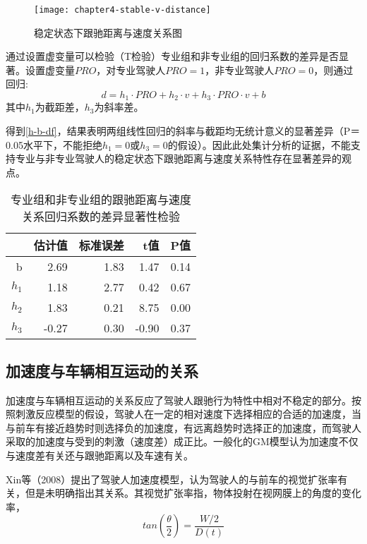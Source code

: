 \begin{figure}[htbp]
\begin{center}
\texttt{[image: chapter4-stable-v-distance]}
\end{center}
\caption{稳定状态下跟驰距离与速度关系图}
\label{stable-v-distance}
\end{figure}

通过设置虚变量可以检验（T检验）专业组和非专业组的回归系数的差异是否显著。设置虚变量$PRO$，对专业驾驶人$PRO=1$，非专业驾驶人$PRO=0$，则通过回归:
\begin{equation}
d=h_1 \cdot PRO+h_2\cdot v + h_3 \cdot PRO \cdot v +b
\end{equation}
其中$h_1$为截距差，$h_3$为斜率差。

得到\autoref{h-b-df}，结果表明两组线性回归的斜率与截距均无统计意义的显著差异（P＝0.05水平下，不能拒绝$h_1=0$或$h_3=0$的假设）。因此此处集计分析的证据，不能支持专业与非专业驾驶人的稳定状态下跟驰距离与速度关系特性存在显著差异的观点。

\begin{table}[htbp]
\begin{center}
\caption{专业组和非专业组的跟驰距离与速度关系回归系数的差异显著性检验}
\begin{tabular}{rrrrr}
  \addlinespace
  \toprule
 & 估计值 & 标准误差 & t值 & P值 \\ 
  \midrule
b & 2.69 & 1.83 & 1.47 & 0.14 \\ 
  $h_1$ & 1.18 & 2.77 & 0.42 & 0.67 \\ 
  $h_2$ & 1.83 & 0.21 & 8.75 & 0.00 \\ 
  $h_3$ & -0.27 & 0.30 & -0.90 & 0.37 \\ 
   \bottomrule
\end{tabular}
\end{center}
\label{h-b-df}
\end{table}


\subsection{加速度与车辆相互运动的关系}
\label{ttc}
加速度与车辆相互运动的关系反应了驾驶人跟驰行为特性中相对不稳定的部分。按照刺激反应模型的假设，驾驶人在一定的相对速度下选择相应的合适的加速度，当与前车有接近趋势时则选择负的加速度，有远离趋势时选择正的加速度，而驾驶人采取的加速度与受到的刺激（速度差）成正比。一般化的GM模型认为加速度不仅与速度差有关还与跟驰距离以及车速有关。


Xin等（2008）\cite{Xin2008}提出了驾驶人加速度模型，认为驾驶人的与前车的视觉扩张率有关，但是未明确指出其关系。其视觉扩张率指，物体投射在视网膜上的角度的变化率，
\begin{equation}
tan(\frac{\theta}{2})=\frac{W/2}{D(t)}
\end{equation}

